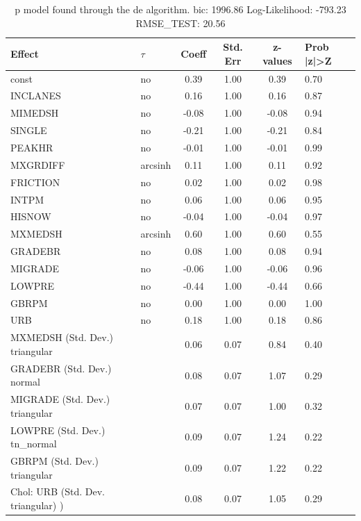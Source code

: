 \begin{table}
	\caption{p model found through the de algorithm. bic: 1996.86 Log-Likelihood: -793.23 RMSE_TEST: 20.56}
	\begin{center}
		\begin{tabular}{|l|l|c|c|c|l|}
			\hline
			Effect & $\tau$ & Coeff & Std. Err & z-values & Prob |z|>Z \\
			\hline
			const & no & 0.39 & 1.00 & 0.39 & 0.70 \\
			\hline
			INCLANES & no & 0.16 & 1.00 & 0.16 & 0.87 \\
			\hline
			MIMEDSH & no & -0.08 & 1.00 & -0.08 & 0.94 \\
			\hline
			SINGLE & no & -0.21 & 1.00 & -0.21 & 0.84 \\
			\hline
			PEAKHR & no & -0.01 & 1.00 & -0.01 & 0.99 \\
			\hline
			MXGRDIFF & arcsinh & 0.11 & 1.00 & 0.11 & 0.92 \\
			\hline
			FRICTION & no & 0.02 & 1.00 & 0.02 & 0.98 \\
			\hline
			INTPM & no & 0.06 & 1.00 & 0.06 & 0.95 \\
			\hline
			HISNOW & no & -0.04 & 1.00 & -0.04 & 0.97 \\
			\hline
			MXMEDSH & arcsinh & 0.60 & 1.00 & 0.60 & 0.55 \\
			\hline
			GRADEBR & no & 0.08 & 1.00 & 0.08 & 0.94 \\
			\hline
			MIGRADE & no & -0.06 & 1.00 & -0.06 & 0.96 \\
			\hline
			LOWPRE & no & -0.44 & 1.00 & -0.44 & 0.66 \\
			\hline
			GBRPM & no & 0.00 & 1.00 & 0.00 & 1.00 \\
			\hline
			URB & no & 0.18 & 1.00 & 0.18 & 0.86 \\
			\hline
			MXMEDSH (Std. Dev.) triangular &  & 0.06 & 0.07 & 0.84 & 0.40 \\
			\hline
			GRADEBR (Std. Dev.) normal &  & 0.08 & 0.07 & 1.07 & 0.29 \\
			\hline
			MIGRADE (Std. Dev.) triangular &  & 0.07 & 0.07 & 1.00 & 0.32 \\
			\hline
			LOWPRE (Std. Dev.) tn_normal &  & 0.09 & 0.07 & 1.24 & 0.22 \\
			\hline
			GBRPM (Std. Dev.) triangular &  & 0.09 & 0.07 & 1.22 & 0.22 \\
			\hline
			 Chol: URB (Std. Dev. triangular) ) &  & 0.08 & 0.07 & 1.05 & 0.29 \\
			\hline
		\end{tabular}
	\end{center}
\end{table}